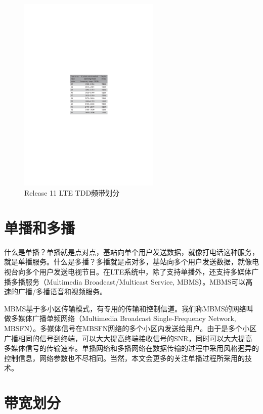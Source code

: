 \documentclass[10pt,a4paper,UTF8]{article}
\begin{document}
\begin{figure}[htb]
\centering
\includegraphics[width=0.6\textwidth]{../../img/20150719lte-tdd.pdf}
\caption{Release 11 LTE TDD频带划分}
\end{figure}

\section{单播和多播}
\label{sec:orgheadline4}


什么是单播？单播就是点对点，基站向单个用户发送数据，就像打电话这种服务，就是单播服务。什么是多播？多播就是点对多，基站向多个用户发送数据，就像电视台向多个用户发送电视节目。在LTE系统中，除了支持单播外，还支持多媒体广播多播服务（Multimedia Broadcast/Multicast Service, MBMS）。MBMS可以高速的广播/多播语音和视频服务。

MBMS基于多小区传输模式，有专用的传输和控制信道。我们称MBMS的网络叫做多媒体广播单频网络（Multimedia Broadcast Single-Frequency Network, MBSFN）。多媒体信号在MBSFN网络的多个小区内发送给用户。由于是多个小区广播相同的信号到终端，可以大大提高终端接收信号的SNR，同时可以大大提高多媒体信号的传输速率。单播网络和多播网络在数据传输的过程中采用风格迥异的控制信息，网络参数也不尽相同。当然，本文会更多的关注单播过程所采用的技术。

\section{带宽划分}
\label{sec:orgheadline5}
\end{document}
